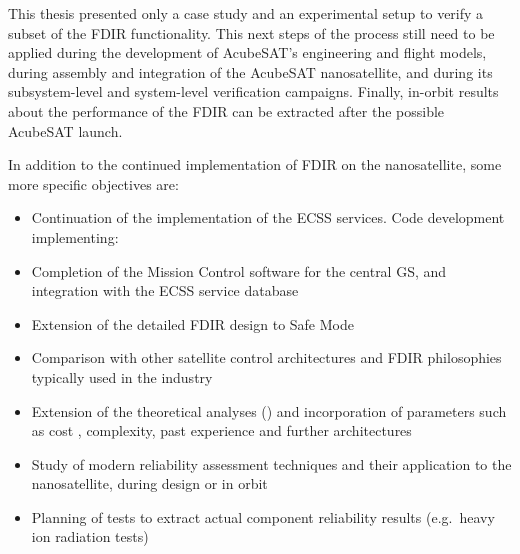 \documentclass[a4paper,nobib,final]{tufte-book}
\begin{document}
\begin{fullwidth}
This thesis presented only a case study and an experimental setup to verify a subset of the \acs{FDIR} functionality. This next steps of the process still need to be applied during the development of AcubeSAT's engineering and flight models, during assembly and integration of the AcubeSAT nanosatellite, and during its subsystem-level and system-level verification campaigns. Finally, in-orbit results about the performance of the \acs{FDIR} can be extracted after the possible AcubeSAT launch.

In addition to the continued implementation of \acs{FDIR} on the nanosatellite, some more specific objectives are:
\begin{itemize}
	\item Continuation of the implementation of the \acs{ECSS} services. Code development implementing:
	\item Completion of the Mission Control software for the central \acl{GS}, and integration with the \acs{ECSS} service database 
	\item Extension of the detailed \acs{FDIR} design to Safe Mode
	\item Comparison with other satellite control architectures and \acs{FDIR} philosophies typically used in the industry \parencite{NASA-HDBK-1002,zolghadri_advanced_modelbased_2012}
	\item Extension of the theoretical analyses () and incorporation of parameters such as cost \parencite{chang_development_reliabilitycorrected_2013}, complexity, past experience and further architectures
	\item Study of modern reliability assessment techniques and their application to the nanosatellite, during design or in orbit
	\item Planning of tests to extract actual component reliability results (e.g.\ heavy ion radiation tests)
\end{itemize}




\end{fullwidth}

\appendix

\begin{fullwidth}
\printbibliography[heading=bibnumbered]
\end{fullwidth}


\printindex
\end{document}
